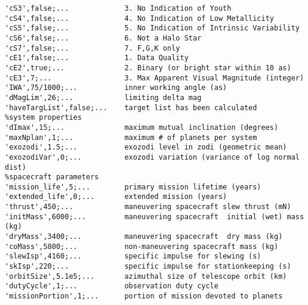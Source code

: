 \begin{verbatim}
'cS3',false;...             3. No Indication of Youth
'cS4',false;...             4. No Indication of Low Metallicity
'cS5',false;...             5. No Indication of Intrinsic Variability
'cS6',false;...             6. Not a Halo Star
'cS7',false;...             7. F,G,K only
'cE1',false;...             1. Data Quality
'cE2',true;...              2. Binary (or bright star within 10 as)
'cE3',7;...                 3. Max Apparent Visual Magnitude (integer)
'IWA',75/1000;...           inner working angle (as)
'dMagLim',26;...            limiting delta mag
'haveTargList',false;...    target list has been calculated
%system properties
'dImax',15;...              maximum mutual inclination (degrees)
'maxNplan',1;...            maximum # of planets per system
'exozodi',1.5;...           exozodi level in zodi (geometric mean)
'exozodiVar',0;...          exozodi variation (variance of log normal dist)
%spacecraft parameters
'mission_life',5;...        primary mission lifetime (years)
'extended_life',0;...       extended mission (years)
'thrust',450;...            maneuvering spacecraft slew thrust (mN)
'initMass',6000;...         maneuvering spacecraft  initial (wet) mass (kg)
'dryMass',3400;...          maneuvering spacecraft  dry mass (kg)
'coMass',5800;...           non-maneuvering spacecraft mass (kg)
'slewIsp',4160;...          specific impulse for slewing (s)
'skIsp',220;...             specific impulse for stationkeeping (s)
'orbitSize',5.1e5;...       azimuthal size of telescope orbit (km)
'dutyCycle',1;...           observation duty cycle
'missionPortion',1;...      portion of mission devoted to planets
\end{verbatim}